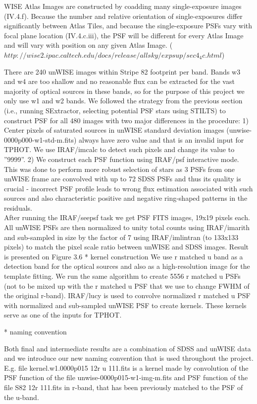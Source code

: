 \documentclass[numberedappendix,apj,twocolumn]{emulateapj}
\begin{document}
WISE Atlas Images are constructed by coadding many single-exposure images (IV.4.f). Because the number and relative orientation of single-exposures differ significantly between Atlas Tiles, and because the single-exposure PSFs vary with focal plane location (IV.4.c.iii), the PSF will be different for every Atlas Image and will vary with position on any given Atlas Image. ($http://wise2.ipac.caltech.edu/docs/release/allsky/expsup/sec4_4c.html$)


There are 240 unWISE images within Stripe 82 footprint per band. Bands w3 and w4
are too shallow and no reasonable flux can be extracted for the vast majority of
optical sources in these bands, so for the purpose of this project we only use w1
and w2 bands. We followed the strategy from the previous section (i.e., running SExtractor, selecting potential PSF stars using STILTS) to construct PSF for all 480 images with two major differences
in the procedure:
1) Center pixels of saturated sources in unWISE standard deviation images (unwise-
0000p000-w1-std-m.fits) always have zero value and that is an invalid input for TPHOT.
We use IRAF/imcalc to detect such pixels and change its value to ”9999”.
2) We construct each PSF function using IRAF/psf interactive mode. This was done to perform more robust selection of stars as 3 PSFs from one unWISE
frame are convolved with up to 72 SDSS PSFs and thus its quality is crucial - incorrect
PSF profile leads to wrong flux estimation associated with such sources and also
characteristic positive and negative ring-shaped patterns in the residuals.
\\
After running the IRAF/seepsf task we get PSF FITS images, 19x19 pixels each. All
unWISE PSFs are then normalized to unity total counts using IRAF/imarith and sub-sampled
in size by the factor of 7 using IRAF/imlintran (to 133x133 pixels) to match the pixel
scale ratio between unWISE and SDSS images. Result is presented on Figure 3.6	
	* kernel construction
We use r matched u band as a detection band for the optical sources and also as a high-resolution image for the template fitting. We run the same algorithm to create 5556 r matched u PSFs (not to be mixed up with the r matched u PSF that we use to change FWHM of the original r-band). IRAF/lucy is used to convolve normalized r matched u PSF with normalized and sub-sampled unWISE PSF to create kernels. These kernels serve as one of the inputs for TPHOT.

* naming convention

Both final and intermediate results are a combination of SDSS and unWISE data and
we introduce our new naming convention that is used throughout the project. E.g. file
kernel.w1.0000p015 12r u 111.fits is a kernel made by convolution of the PSF function
of the file unwise-0000p015-w1-img-m.fits and PSF function of the file S82 12r 111.fits
in r-band, that has been previously matched to the PSF of the u-band.
\end{document}

